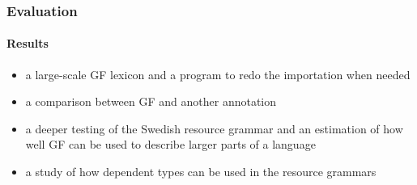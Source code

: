 \documentclass[10pt]{beamer}
\renewcommand{\baselinestretch}{1.5}
\begin{document}
%
%
%

\begin{frame}
 \renewcommand{\baselinestretch}{1.0}
\frametitle{Evaluation}
\framesubtitle{Results} 
\begin{itemize}
\item a large-scale GF lexicon and a program to redo the importation when needed
\item a comparison between GF and another annotation
\item a deeper testing of the Swedish resource grammar and an estimation
of how well GF can be used to describe larger parts of a language
\item a study of how dependent types can be used in the resource grammars
\end{itemize}
\end{frame}




\end{document}
